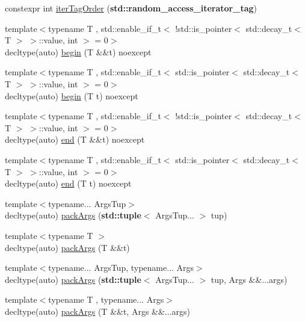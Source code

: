 \begin{DoxyCompactItemize}
\item 
constexpr int \hyperlink{namespaceit_1_1help_ace8fe9c3bfab2e8d912b0b4ee5cd73cf}{iter\+Tag\+Order} ({\bf std\+::random\+\_\+access\+\_\+iterator\+\_\+tag})
\item 
{\footnotesize template$<$typename T , std\+::enable\+\_\+if\+\_\+t$<$ !std\+::is\+\_\+pointer$<$ std\+::decay\+\_\+t$<$ T $>$ $>$\+::value, int $>$  = 0$>$ }\\decltype(auto) \hyperlink{namespaceit_1_1help_a802b665d476523c866525ae94b4b9f29}{begin} (T \&\&t) noexcept
\item 
{\footnotesize template$<$typename T , std\+::enable\+\_\+if\+\_\+t$<$ std\+::is\+\_\+pointer$<$ std\+::decay\+\_\+t$<$ T $>$ $>$\+::value, int $>$  = 0$>$ }\\decltype(auto) \hyperlink{namespaceit_1_1help_a0e251e42731da1b6effa4e0670de4aa3}{begin} (T t) noexcept
\item 
{\footnotesize template$<$typename T , std\+::enable\+\_\+if\+\_\+t$<$ !std\+::is\+\_\+pointer$<$ std\+::decay\+\_\+t$<$ T $>$ $>$\+::value, int $>$  = 0$>$ }\\decltype(auto) \hyperlink{namespaceit_1_1help_a5e58a8ad21890518f5b2a070f01653ef}{end} (T \&\&t) noexcept
\item 
{\footnotesize template$<$typename T , std\+::enable\+\_\+if\+\_\+t$<$ std\+::is\+\_\+pointer$<$ std\+::decay\+\_\+t$<$ T $>$ $>$\+::value, int $>$  = 0$>$ }\\decltype(auto) \hyperlink{namespaceit_1_1help_ad128b1f9a801d33454c092c5d64b48a6}{end} (T t) noexcept
\item 
{\footnotesize template$<$typename... Args\+Tup$>$ }\\decltype(auto) \hyperlink{namespaceit_1_1help_a8dad918e01e53be17799fb6e354405c5}{pack\+Args} ({\bf std\+::tuple}$<$ Args\+Tup... $>$ tup)
\item 
{\footnotesize template$<$typename T $>$ }\\decltype(auto) \hyperlink{namespaceit_1_1help_ac3e8099edb27b15fb5e922d8e84ce726}{pack\+Args} (T \&\&t)
\item 
{\footnotesize template$<$typename... Args\+Tup, typename... Args$>$ }\\decltype(auto) \hyperlink{namespaceit_1_1help_ae80ffec31c98e283cd2c0f6d439e5848}{pack\+Args} ({\bf std\+::tuple}$<$ Args\+Tup... $>$ tup, Args \&\&...args)
\item 
{\footnotesize template$<$typename T , typename... Args$>$ }\\decltype(auto) \hyperlink{namespaceit_1_1help_a7acb1e6ed32d92b01ff1b52fbd1efe26}{pack\+Args} (T \&\&t, Args \&\&...args)
\end{DoxyCompactItemize}
